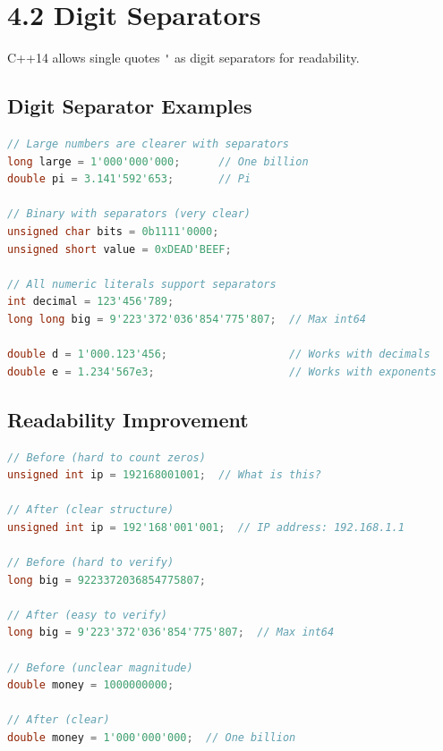 \hypertarget{digit-separators}{%
\section{4.2 Digit Separators}\label{digit-separators}}

C++14 allows single quotes \passthrough{\lstinline!'!} as digit
separators for readability.

\hypertarget{digit-separator-examples}{%
\subsection{Digit Separator Examples}\label{digit-separator-examples}}

\begin{lstlisting}[language={C++}]
// Large numbers are clearer with separators
long large = 1'000'000'000;      // One billion
double pi = 3.141'592'653;       // Pi

// Binary with separators (very clear)
unsigned char bits = 0b1111'0000;
unsigned short value = 0xDEAD'BEEF;

// All numeric literals support separators
int decimal = 123'456'789;
long long big = 9'223'372'036'854'775'807;  // Max int64

double d = 1'000.123'456;                   // Works with decimals
double e = 1.234'567e3;                     // Works with exponents
\end{lstlisting}

\hypertarget{readability-improvement}{%
\subsection{Readability Improvement}\label{readability-improvement}}

\begin{lstlisting}[language={C++}]
// Before (hard to count zeros)
unsigned int ip = 192168001001;  // What is this?

// After (clear structure)
unsigned int ip = 192'168'001'001;  // IP address: 192.168.1.1

// Before (hard to verify)
long big = 9223372036854775807;

// After (easy to verify)
long big = 9'223'372'036'854'775'807;  // Max int64

// Before (unclear magnitude)
double money = 1000000000;

// After (clear)
double money = 1'000'000'000;  // One billion
\end{lstlisting}

